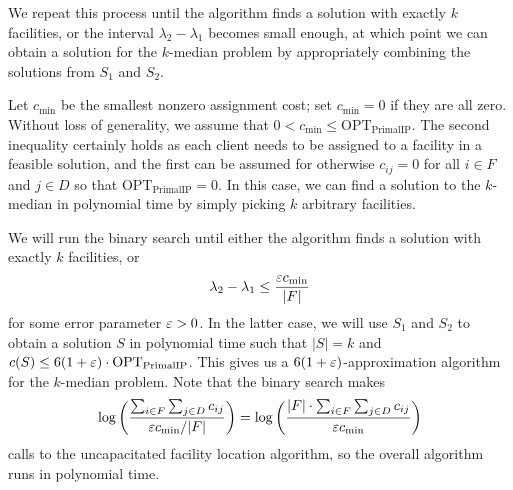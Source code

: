 We repeat this process until the algorithm finds a solution with exactly 
$k$ facilities, or the interval $\lambda_2 - \lambda_1$ becomes small enough, 
at which point we can obtain a solution for the $k$-median problem 
by appropriately combining the solutions from $S_1$ and $S_2$. 

Let $c_{\min}$ be the smallest 
nonzero assignment cost; set $c_{\min} = 0$ if they are all zero. 
Without loss of generality, we assume that $0 < c_{\min} \leq 
\text{OPT}_{\text{PrimalIP}}$. 
The second inequality certainly holds as each client needs to be assigned 
to a facility in a feasible solution, and the first can be assumed for otherwise 
$c_{ij} = 0$ for all $i \in F$ and $j \in D$ so that $\text{OPT}_{\text{PrimalIP}} = 0$. 
In this case, we can find a solution to the $k$-median in polynomial time 
by simply picking $k$ arbitrary facilities. 

We will run the binary search until either 
the algorithm finds a solution with exactly $k$ facilities, or 
\[ \lambda_2 - \lambda_1 \leq \frac{\varepsilon c_{\min}}{|F|} \] 
for some error parameter $\varepsilon > 0$. 
In the latter case, we will use $S_1$ and $S_2$ to obtain a solution $S$
in polynomial time such that $|S| = k$ and $c(S) \leq 6(1+\varepsilon) \cdot 
\text{OPT}_{\text{PrimalIP}}$. This gives us a $6(1+\varepsilon)$-approximation 
algorithm for the $k$-median problem. Note that the binary search makes 
\[ \log \left( \frac{\sum_{i\in F} \sum_{j\in D} c_{ij}}{\varepsilon c_{\min}/|F|} 
\right) = \log \left( \frac{|F| \cdot \sum_{i\in F} \sum_{j\in D} c_{ij}}{\varepsilon c_{\min}} \right) \] 
calls to the uncapacitated facility location algorithm, so the overall 
algorithm runs in polynomial time.


